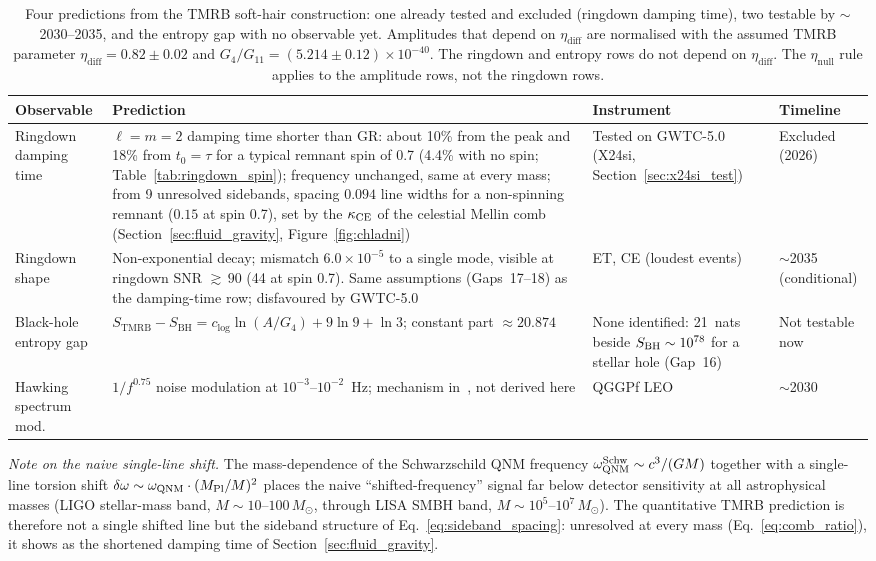 \documentclass[11pt,a4paper]{article}
\begin{document}
\begin{table}[ht]
\centering
\caption{Four predictions from the TMRB soft-hair construction: one already tested and excluded (ringdown damping time), two testable by $\sim$2030--2035, and the entropy gap with no observable yet.
Amplitudes that depend on $\eta_{\mathrm{diff}}$ are normalised with the assumed TMRB parameter
$\eta_{\mathrm{diff}} = 0.82\pm0.02$ and $G_4/G_{11} = (5.214\pm0.12)\times10^{-40}$. The ringdown and entropy rows do not depend on $\eta_{\mathrm{diff}}$. The $\eta_{\mathrm{null}}$ rule applies to the amplitude rows, not the ringdown rows.}
\label{tab:predictions}
\begin{tabular}{p{2.7cm}p{4.9cm}p{3.1cm}p{2.1cm}}
\toprule
Observable & Prediction & Instrument & Timeline \\
\midrule
Ringdown damping time
  & $\ell=m=2$ damping time shorter than GR: about 10\% from the peak and 18\% from
    $t_0 = \tau$ for a typical remnant spin of 0.7 (4.4\% with no spin;
    Table~\ref{tab:ringdown_spin}); frequency unchanged, same at every mass; from 9 unresolved
    sidebands, spacing $0.094$ line widths for a non-spinning remnant ($0.15$ at spin 0.7), set by the $\kappa_{\rm CE}$ of the
    celestial Mellin comb~\cite{BresslerCH2026,BresslerMellin2026}
    (Section~\ref{sec:fluid_gravity}, Figure~\ref{fig:chladni})
  & Tested on GWTC-5.0~\cite{GWTC5TGR} (X24si, Section~\ref{sec:x24si_test})
  & Excluded (2026) \\
Ringdown shape
  & Non-exponential decay; mismatch $6.0\times10^{-5}$ to a single mode,
    visible at ringdown SNR ${\gtrsim}\,90$ (44 at spin 0.7).
    Same assumptions (Gaps~17--18) as the damping-time row; disfavoured by GWTC-5.0
  & ET, CE (loudest events)
  & $\sim$2035 (conditional) \\
Black-hole entropy gap
  & $S_{\mathrm{TMRB}} - S_{\mathrm{BH}} = c_{\log}\ln(A/G_4) + 9\ln 9 + \ln 3$;
    constant part $\approx 20.874$
  & None identified: 21~nats beside $S_{\rm BH}\sim10^{78}$ for a stellar hole (Gap~16)
  & Not testable now \\
Hawking spectrum mod.
  & $1/f^{0.75}$ noise modulation at $10^{-3}$--$10^{-2}$~Hz;
    mechanism in~\cite{BresslerQG2026}, not derived here
  & QGGPf LEO \cite{BresslerQG2026}
  & $\sim$2030 \\
\bottomrule
\end{tabular}
\end{table}

\noindent\textit{Note on the naive single-line shift.}
The mass-dependence of the Schwarzschild QNM frequency
$\omega_{\rm QNM}^{\rm Schw} \sim c^3/(GM)$ together with a single-line torsion
shift $\delta\omega \sim \omega_{\rm QNM}\cdot(M_{\rm Pl}/M)^2$ places the naive
``shifted-frequency'' signal far below detector sensitivity at all astrophysical
masses (LIGO stellar-mass band, $M\sim 10$--$100\,M_\odot$, through LISA SMBH
band, $M\sim 10^5$--$10^7\,M_\odot$). The quantitative TMRB prediction is
therefore not a single shifted line but the sideband structure of
Eq.~\eqref{eq:sideband_spacing}: unresolved at every mass
(Eq.~\eqref{eq:comb_ratio}), it shows as the shortened damping time of
Section~\ref{sec:fluid_gravity}.
\end{document}
